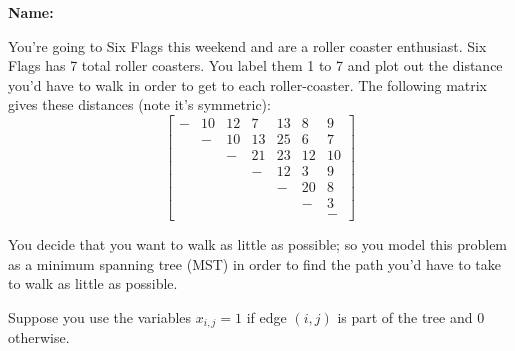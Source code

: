 \documentclass[letterpaper,oneside,12pt]{article}%
\begin{document}
\noindent{}

\vspace{3mm} \hspace{\fill} \textbf{Name: \underline{\hspace{6cm}}}

You're going to Six Flags this weekend and are a roller coaster enthusiast. Six Flags has 7 total roller coasters. You label them 1 to 7 and plot out the distance you'd have to walk in order to get to each roller-coaster. The following matrix gives these distances (note it's symmetric):
\[
\begin{bmatrix}
-& 10 & 12 & 7  & 13 & 8  & 9 \\
 & -  & 10 & 13 & 25 & 6  & 7 \\
 &    & -  & 21 & 23 & 12 & 10 \\
 &    &    & -  & 12 & 3  & 9   \\
 &    &    &    & -  & 20 & 8   \\
 &    &    &    &    & -  & 3   \\
 &    &    &    &    &    & -
\end{bmatrix}
\]

You decide that you want to walk as little as possible; so you model this problem as a minimum spanning tree (MST) in order to find the path you'd have to take to walk as little as possible.

Suppose you use the variables $x_{i,j} = 1$ if edge $(i,j)$ is part of the tree and 0 otherwise.
\end{document}
